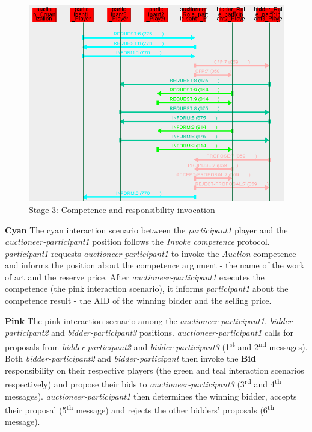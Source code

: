 \begin{figure}[H]
	\centering
	\includegraphics[width=\textwidth]{images/example3-stage3.png}
	\caption{Stage 3: Competence and responsibility invocation}
	\label{figure:example3-stage3}
\end{figure}

\textbf{Cyan} The cyan interaction scenario between the \textit{participant1} player and the \textit{auctioneer-participant1} position follows the \textit{Invoke competence} protocol.
\textit{participant1} requests \textit{auctioneer-participant1} to invoke the \textit{Auction} competence and informs the position about the competence argument - the name of the work of art and the reserve price.
After \textit{auctioneer-participant1} executes the competence (the pink interaction scenario), it informs \textit{participant1} about the competence result - the AID of the winning bidder and the selling price.

\textbf{Pink} The pink interaction scenario among the \textit{auctioneer-participant1}, \textit{bidder-participant2} and \textit{bidder-participant3} positions.
\textit{auctioneer-participant1} calls for proposals from \textit{bidder-participant2} and \textit{bidder-participant3} (1\textsuperscript{st} and 2\textsuperscript{nd} messages).
Both \textit{bidder-participant2} and \textit{bidder-participant} then invoke the \textbf{Bid} responsibility on their respective players (the green and teal interaction scenarios respectively) and propose their bids to \textit{auctioneer-participant3} (3\textsuperscript{rd} and 4\textsuperscript{th} messages).
\textit{auctioneer-participant1} then determines the winning bidder, accepts their proposal (5\textsuperscript{th} message) and rejects the other bidders' proposals (6\textsuperscript{th} message).


